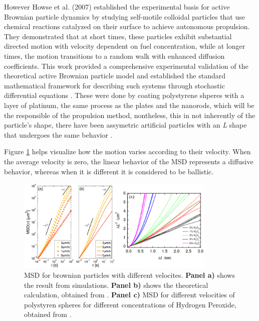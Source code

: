 However Howse et al. (2007) established the experimental basis for active Brownian particle dynamics by studying self-motile colloidal particles that use chemical reactions catalyzed on their surface to achieve autonomous propulsion. They demonstrated that at short times, these particles exhibit substantial directed motion with velocity dependent on fuel concentration, while at longer times, the motion transitions to a random walk with enhanced diffusion coefficients. This work provided a comprehensive experimental validation of the theoretical active Brownian particle model and established the standard mathematical framework for describing such systems through stochastic differential equations \cite{howse2007self, palacci2010sedimentation}. These were done by coating polystyrene shperes with a layer of platinum, the same process as the plates and the nanorods, which will be the responsible of the propulsion method, nontheless, this in not inherently of the particle's shape, there have been assymetric artificial particles with an \textit{L} shape that undergoes the same behavior \cite{kummel2013circular}.

Figure \ref{fig:msddifferentvelocities} helps visualize how  the motion varies according to their velocity. When the average velocity is zero, the linear behavior of the MSD represents a diffusive behavior, whereas when it is different it is considered to be ballistic. 

\begin{figure}[h]
  \begin{center}
    \includegraphics[width=0.85\textwidth]{figures/msdmicroscopicagents.pdf}
  \end{center}
  \caption[MSD for brownian particles]{MSD for brownian particles with different velocites. \textbf{Panel a)} shows the result from simulations. \textbf{Panel b)} shows the theoretical calculation, obtained from \cite{volpe2014simulation}. \textbf{Panel c)} MSD for different velocities of polystyren spheres for different concentrations of Hydrogen Peroxide, obtained from \cite{howse2007self}.}\label{fig:msddifferentvelocities}
\end{figure}

